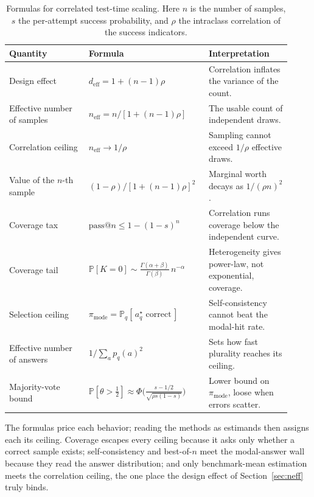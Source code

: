 \documentclass[11pt]{article}
\newcommand{\Prob}{\mathbb{P}}
\newcommand{\neff}{n_{\mathrm{eff}}}
\newcommand{\deff}{d_{\mathrm{eff}}}
\begin{document}
\begin{table}[H]
\centering
\caption{Formulas for correlated test-time scaling. Here $n$ is the number of samples, $s$ the per-attempt success probability, and $\rho$ the intraclass correlation of the success indicators.}
\label{tab:formulas}
{\small
\renewcommand{\arraystretch}{1.22}
\begin{tabular}{@{}p{0.27\linewidth}p{0.37\linewidth}p{0.28\linewidth}@{}}
\toprule
\textbf{Quantity} & \textbf{Formula} & \textbf{Interpretation} \\
\midrule
Design effect & $\deff = 1+(n-1)\rho$ & Correlation inflates the variance of the count. \\
\addlinespace[2pt]
Effective number of samples & $\neff = n/[1+(n-1)\rho]$ & The usable count of independent draws. \\
\addlinespace[2pt]
Correlation ceiling & $\neff \to 1/\rho$ & Sampling cannot exceed $1/\rho$ effective draws. \\
\addlinespace[2pt]
Value of the $n$-th sample & $(1-\rho)/[1+(n-1)\rho]^2$ & Marginal worth decays as $1/(\rho n)^2$. \\
\addlinespace[2pt]
Coverage tax & $\mathrm{pass}@n \le 1-(1-s)^n$ & Correlation runs coverage below the independent curve. \\
\addlinespace[2pt]
Coverage tail & $\Prob[K{=}0]\sim \tfrac{\Gamma(\alpha+\beta)}{\Gamma(\beta)}\,n^{-\alpha}$ & Heterogeneity gives power-law, not exponential, coverage. \\
\addlinespace[2pt]
Selection ceiling & $\pi_{\mathrm{mode}} = \Prob_q[\,a^\star_q\text{ correct}\,]$ & Self-consistency cannot beat the modal-hit rate. \\
\addlinespace[2pt]
Effective number of answers & $1/\sum_a p_q(a)^2$ & Sets how fast plurality reaches its ceiling. \\
\addlinespace[2pt]
Majority-vote bound & $\Prob[\theta>\tfrac12]\approx\Phi\big(\tfrac{s-1/2}{\sqrt{\rho s(1-s)}}\big)$ & Lower bound on $\pi_{\mathrm{mode}}$, loose when errors scatter. \\
\bottomrule
\end{tabular}}
\end{table}

The formulas price each behavior; reading the methods as estimands then assigns each its ceiling. Coverage escapes every ceiling because it asks only whether a correct sample exists; self-consistency and best-of-$n$ meet the modal-answer wall because they read the answer distribution; and only benchmark-mean estimation meets the correlation ceiling, the one place the design effect of Section~\ref{sec:neff} truly binds.
\end{document}
